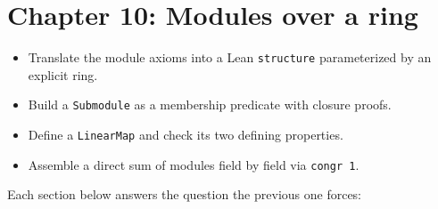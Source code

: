 \chapter{Chapter 10: Modules over a ring}\label{sec:10-modules:00-index:1}

\begin{learningobjectives}
\begin{itemize}
\tightlist
\item
  Translate the module axioms into a Lean \texttt{structure} parameterized by an explicit ring.
\item
  Build a \texttt{Submodule} as a membership predicate with closure proofs.
\item
  Define a \texttt{LinearMap} and check its two defining properties.
\item
  Assemble a direct sum of modules field by field via \texttt{congr 1}.
\end{itemize}
\end{learningobjectives}


Each section below answers the question the previous one forces:

